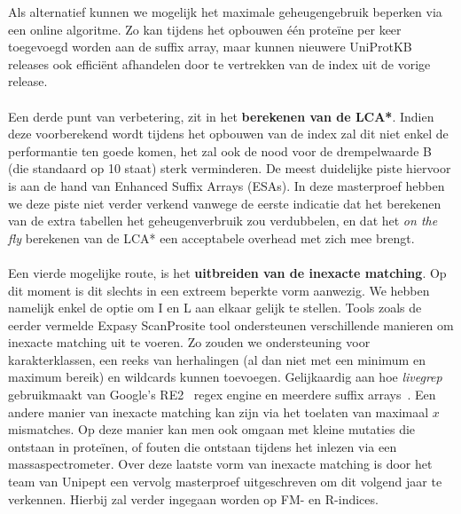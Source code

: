Als alternatief kunnen we mogelijk het maximale geheugengebruik beperken via een online algoritme.
Zo kan tijdens het opbouwen één proteïne per keer toegevoegd worden aan de suffix array, maar kunnen nieuwere UniProtKB releases ook efficiënt afhandelen door te vertrekken van de index uit de vorige release.
\\ \\
Een derde punt van verbetering, zit in het \textbf{berekenen van de LCA*}.
Indien deze voorberekend wordt tijdens het opbouwen van de index zal dit niet enkel de performantie ten goede komen, het zal ook de nood voor de drempelwaarde B (die standaard op 10 staat) sterk verminderen.
De meest duidelijke piste hiervoor is aan de hand van Enhanced Suffix Arrays (ESAs).
In deze masterproef hebben we deze piste niet verder verkend vanwege de eerste indicatie dat het berekenen van de extra tabellen het geheugenverbruik zou verdubbelen, en dat het \textit{on the fly} berekenen van de LCA* een acceptabele overhead met zich mee brengt.
\\ \\
Een vierde mogelijke route, is het \textbf{uitbreiden van de inexacte matching}.
Op dit moment is dit slechts in een extreem beperkte vorm aanwezig.
We hebben namelijk enkel de optie om I en L aan elkaar gelijk te stellen.
Tools zoals de eerder vermelde Expasy ScanProsite tool ondersteunen verschillende manieren om inexacte matching uit te voeren.
Zo zouden we ondersteuning voor karakterklassen, een reeks van herhalingen (al dan niet met een minimum en maximum bereik) en wildcards kunnen toevoegen.
Gelijkaardig aan hoe \textit{livegrep}~\cite{livegrep} gebruikmaakt van Google's RE2~\cite{re2} regex engine en meerdere suffix arrays~\cite{regex_sa}.
Een andere manier van inexacte matching kan zijn via het toelaten van maximaal $x$ mismatches.
Op deze manier kan men ook omgaan met kleine mutaties die ontstaan in proteïnen, of fouten die ontstaan tijdens het inlezen via een massaspectrometer.
Over deze laatste vorm van inexacte matching is door het team van Unipept een vervolg masterproef uitgeschreven om dit volgend jaar te verkennen.
Hierbij zal verder ingegaan worden op FM- en R-indices.
